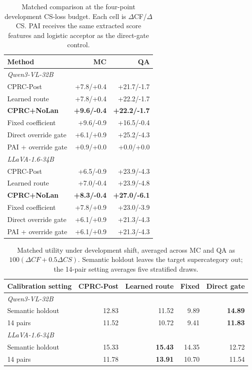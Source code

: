 \documentclass[letterpaper]{article}
\begin{document}
\begin{table}[t]
\centering
\small
\setlength{\tabcolsep}{4.0pt}
\begin{tabular}{lrr}
\toprule
Method & MC & QA \\
\midrule
\multicolumn{3}{l}{\itshape Qwen3-VL-32B} \\
CPRC-Post & +7.8/+0.4 & +21.7/-1.7 \\
Learned route & +7.8/+0.4 & +22.2/-1.7 \\
\textbf{CPRC+NoLan} & \textbf{+9.6/-0.4} & \textbf{+22.2/-1.7} \\
Fixed coefficient & +9.6/-0.9 & +16.5/-0.4 \\
Direct override gate & +6.1/+0.9 & +25.2/-4.3 \\
PAI + override gate & +0.9/+0.0 & +0.0/+0.0 \\
\midrule
\multicolumn{3}{l}{\itshape LLaVA-1.6-34B} \\
CPRC-Post & +6.5/-0.9 & +23.9/-4.3 \\
Learned route & +7.0/-0.4 & +23.9/-4.8 \\
\textbf{CPRC+NoLan} & \textbf{+8.3/-0.4} & \textbf{+27.0/-6.1} \\
Fixed coefficient & +7.8/+0.9 & +23.0/-3.9 \\
Direct override gate & +6.1/+0.9 & +21.3/-4.3 \\
PAI + override gate & +6.1/+0.9 & +21.3/-4.3 \\
\bottomrule
\end{tabular}
\caption{Matched comparison at the four-point development CS-loss budget.
Each cell is $\Delta$CF/$\Delta$CS. PAI receives the same extracted score
features and logistic acceptor as the direct-gate control.}
\label{tab:matched-gate-four}
\end{table}

\begin{table}[t]
\centering
\small
\setlength{\tabcolsep}{2.1pt}
\begin{tabular}{lrrrr}
\toprule
Calibration setting & CPRC-Post & Learned route & Fixed & Direct gate \\
\midrule
\multicolumn{5}{l}{\itshape Qwen3-VL-32B} \\
Semantic holdout & 12.83 & 11.52 & 9.89 & \textbf{14.89} \\
14 pairs & 11.52 & 10.72 & 9.41 & \textbf{11.83} \\
\midrule
\multicolumn{5}{l}{\itshape LLaVA-1.6-34B} \\
Semantic holdout & 15.33 & \textbf{15.43} & 14.35 & 12.72 \\
14 pairs & 11.78 & \textbf{13.91} & 10.70 & 11.54 \\
\bottomrule
\end{tabular}
\caption{Matched utility under development shift, averaged across MC and QA as
$100(\Delta CF+0.5\Delta CS)$. Semantic holdout leaves the target
supercategory out; the 14-pair setting averages five stratified draws.}
\label{tab:matched-shift}
\end{table}
\end{document}
